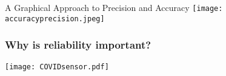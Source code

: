 \documentclass[notes=only]{beamer}
\begin{document}
\begin{frame}{A Graphical Approach to Precision and Accuracy}
	\centering
	\texttt{[image: accuracyprecision.jpeg]}
\end{frame}

%
%

\begin{frame}[c]
	\frametitle{Why is reliability important?}
	\centering
	\texttt{[image: COVIDsensor.pdf]}
\end{frame}
\end{document}

